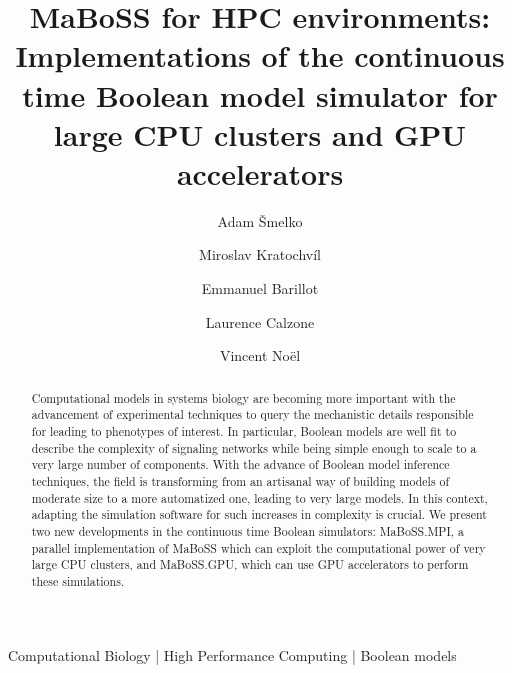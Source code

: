 \documentclass[times, twoside]{zHenriquesLab-StyleBioRxiv}
\begin{document}
\title{MaBoSS for HPC environments: Implementations of the continuous time Boolean model simulator for large CPU clusters and GPU accelerators}

\author[1,\Letter]{Adam Šmelko}
\author[2]{Miroslav Kratochvíl}
\author[3,4,5]{Emmanuel Barillot}
\author[3,4,5]{Laurence Calzone}
\author[3,4,5,\Letter]{Vincent Noël}

\maketitle

\begin{abstract}
Computational models in systems biology are becoming more important with the advancement of experimental techniques to query the mechanistic details responsible for leading to phenotypes of interest. In particular, Boolean models are well fit to describe the complexity of signaling networks while being simple enough to scale to a very large number of components. With the advance of Boolean model inference techniques, the field is transforming from an artisanal way of building models of moderate size to a more automatized one, leading to very large models. In this context, adapting the simulation software for such increases in complexity is crucial. 
We present two new developments in the continuous time Boolean simulators: MaBoSS.MPI, a parallel implementation of MaBoSS which can exploit the computational power of very large CPU clusters, and MaBoSS.GPU, which can use GPU accelerators to perform these simulations. 
\end {abstract}

\begin{keywords}
Computational Biology | High Performance Computing | Boolean models
\end{keywords}
\end{document}
